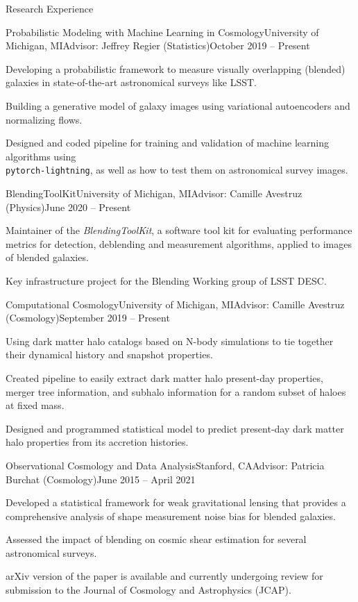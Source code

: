 \begin{rSection}{Research Experience}

\begin{rSubsection}{Probabilistic Modeling with Machine Learning in Cosmology}{University of Michigan, MI}{Advisor: Jeffrey Regier (Statistics)}{October 2019 -- Present}
\item Developing a probabilistic framework to measure visually overlapping (blended) galaxies in state-of-the-art astronomical surveys like LSST. 
\item Building a generative model of galaxy images using variational autoencoders and normalizing flows. 
\item Designed and coded pipeline for training and validation of machine learning algorithms using \\ \texttt{pytorch-lightning}, as well as how to test them on astronomical survey images.
\end{rSubsection}

\begin{rSubsection}{BlendingToolKit}{University of Michigan, MI}{Advisor: Camille Avestruz (Physics)}{June 2020 -- Present}
\item Maintainer of the \textit{BlendingToolKit}, a software tool kit for evaluating performance metrics for detection, deblending and measurement algorithms, applied to images of blended galaxies.
\item Key infrastructure project for the Blending Working group of LSST DESC.
\end{rSubsection}

\begin{rSubsection}{Computational Cosmology}{University of Michigan, MI}{Advisor: Camille Avestruz (Cosmology)}{September 2019 -- Present}
\item Using dark matter halo catalogs based on N-body simulations to tie together their dynamical history and snapshot properties. 
\item Created pipeline to easily extract dark matter halo present-day properties, merger tree information, and subhalo information for a random subset of haloes at fixed mass.
\item Designed and programmed statistical model to predict present-day dark matter halo properties from its accretion histories.
\end{rSubsection}

\begin{rSubsection}{Observational Cosmology and Data Analysis}{Stanford, CA}{Advisor: Patricia Burchat (Cosmology)}{June 2015 -- April 2021}
\item Developed a statistical framework for weak gravitational lensing that provides a comprehensive analysis of shape measurement noise bias for blended galaxies.
\item Assessed the impact of blending on cosmic shear estimation for several astronomical surveys.
\item arXiv version of the paper is available and currently undergoing review for submission to the Journal of Cosmology and Astrophysics (JCAP). 
\end{rSubsection}


\end{rSection}
